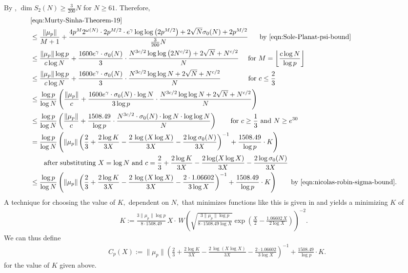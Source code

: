 \documentclass[11pt,letterpaper,reqno]{amsart}
\theoremstyle{definition}
\numberwithin{equation}{section}
\numberwithin{figure}{section}
\numberwithin{table}{section}
\begin{document}
By \cite[Corollary 15]{MS07}, $\dim S_2(N) \ge \frac{3}{200} N$ for $N \geq 61.$ Therefore,
\begin{align}
    &\eqref{eqn:Murty-Sinha-Theorem-19}\\
    &\leq \frac{\| \mu_p\|}{M + 1} + \frac{4p^{M} 2^{\omega(N)}\cdot 2p^{M/2} \cdot e^\gamma \log \log \left( 2 p^{M/2} \right) + 2\sqrt{N}\sigma_0(N) + 2p^{M/2}}{\frac{3}{200} N} \quad\ \  \text{by \eqref{eqn:Sole-Planat-psi-bound}}\\
    & \leq \frac{\| \mu_p\| \log p}{c \log N} + \frac{1600 e^\gamma \cdot \sigma_0(N)}{3} \cdot  \frac{N^{3c/2} \log \log \left( 2N^{c/2}  \right) + 2\sqrt{N} + N^{c/2}}{ N} \quad\ \text{for $M = \left\lfloor \frac{c \log N}{\log p} \right\rfloor$}\\
    & \leq \frac{\| \mu_p\| \log p}{c \log N} + \frac{1600 e^\gamma \cdot \sigma_0(N)}{3} \cdot  \frac{  N^{3c/2} \log \log N + 2\sqrt{N} + N^{c/2}}{N} \qquad\qquad \text{for $c \leq \frac{2}{3}$}\\
    & \leq \frac{\log p}{\log N} \left( \frac{\| \mu_p\|}{c} + \frac{1600 e^\gamma \cdot \sigma_0(N) \cdot \log N}{3 \log p} \cdot  \frac{  N^{3c/2} \log \log N + 2\sqrt{N} + N^{c/2}}{N} \right)\\
    & \leq \frac{\log p}{\log N} \left( \frac{\| \mu_p\|}{c} + \frac{1508.49}{\log p} \cdot  \frac{N^{3c/2} \cdot \sigma_0(N) \cdot \log N \cdot \log \log N}{N} \right) \qquad \text{for $c \geq \frac{1}{3}$ and $N \geq e^{30}$}\\
    & = \frac{\log p}{\log N} \left( \| \mu_p \| \left( \frac{2}{3} + \frac{2\log K}{3X} - \frac{2 \, \log \left( X \log X  \right)}{3 X} - \frac{2 \log \sigma_0(N)}{3 X}  \right)^{-1} + \frac{1508.49}{\log p} \cdot K  \right)\\
    & \qquad \text{after substituting $X = \log N$ and $c = \frac{2}{3} + \frac{2\log K}{3X} - \frac{2\log (X \log X)}{3X} - \frac{2 \log \sigma_0(N)}{3X}$}\\
    &\leq \frac{\log p}{\log N} \left( \| \mu_p \| \left( \frac{2}{3} + \frac{2\log K}{3X} - \frac{2 \, \log \left( X \log X  \right)}{3 X} - \frac{2 \cdot 1.06602}{3 \log X}  \right)^{-1} + \frac{1508.49}{\log p} \cdot K  \right) \qquad \text{by \eqref{eqn:nicolas-robin-sigma-bound}}.
\end{align}
    A technique for choosing the value of $K,$ dependent on $N,$ that minimizes functions like this is given in \cite[Appendix A]{KMRX} and yields a minimizing $K$ of
    \begin{align}
        K := \frac{3 \| \mu_p \| \log p}{8 \cdot 1508.49} \, X \cdot  \, W \! \left( \sqrt{\frac{3 \| \mu_p \| \log p}{8 \cdot 1508.49 \log X}} \exp \left( \frac{X}{2} - \frac{1.06602 \, X }{2 \log X} \right) \right)^{-2}.
    \end{align}
    We can thus define
    \begin{align}
        \quad C_p(X) := \| \mu_p \| \left( \frac{2}{3} + \frac{2\log K}{3X} - \frac{2 \, \log \left( X \log X  \right)}{3 X} - \frac{2 \cdot 1.06602}{3 \log X}  \right)^{-1} + \frac{1508.49}{\log p} \cdot K. \label{eqn:formula-for-C}
    \end{align}
    for the value of $K$ given above. 
\end{document}
